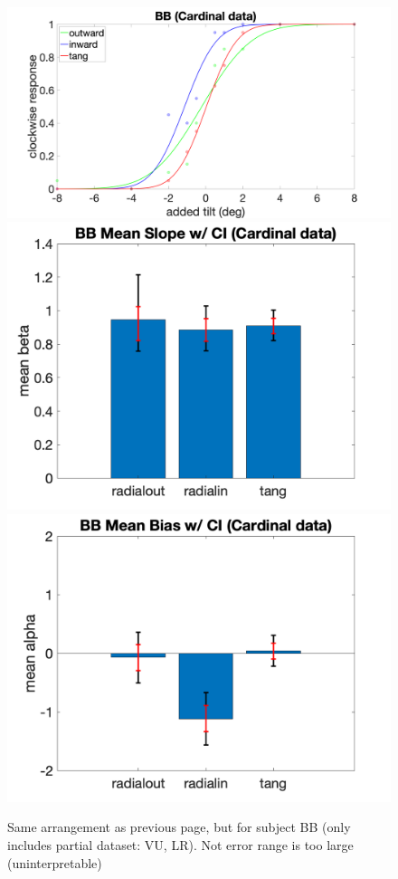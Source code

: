 \documentclass[11pt]{article} %
\begin{document}
\begin{figure}[H]
\includegraphics[scale=.06]{Images/PF_BB_cardinal.png}
\includegraphics[scale=.11]{Images/MeanSlopeError_ci_BB_cardinal.png}
\includegraphics[scale=.11]{Images/MeanBiasError_ci_BB_cardinal.png}
\caption{Same arrangement as previous page, but for subject BB (only includes partial dataset: VU, LR). Not error range is too large (uninterpretable)}
\end{figure}
\end{document}
